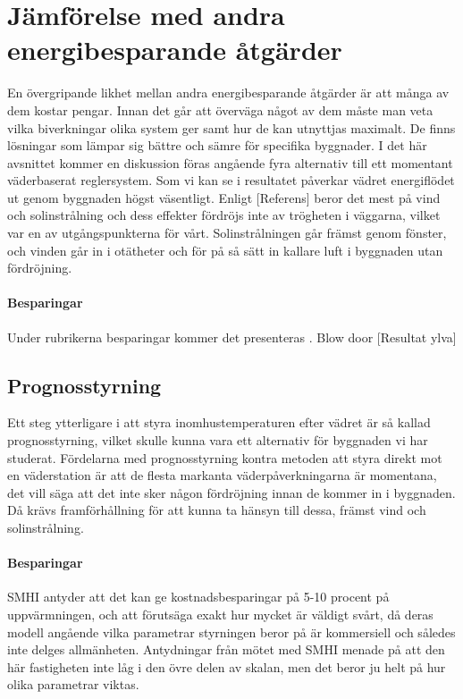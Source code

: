 \section{Jämförelse med andra energibesparande åtgärder}

En övergripande likhet mellan andra energibesparande åtgärder är att många av dem kostar pengar. Innan det går att överväga något av dem måste man veta vilka biverkningar olika system ger samt hur de kan utnyttjas maximalt. De finns lösningar som lämpar sig bättre och sämre för specifika byggnader. I det här avsnittet kommer en diskussion föras angående fyra alternativ till ett momentant väderbaserat reglersystem.
Som vi kan se i resultatet påverkar vädret energiflödet ut genom byggnaden högst väsentligt. Enligt [Referens] beror det mest på vind och solinstrålning och dess effekter fördröjs inte av trögheten i väggarna, vilket var en av utgångspunkterna för vårt. Solinstrålningen går främst genom fönster, och vinden går in i otätheter och för på så sätt in kallare luft i byggnaden utan fördröjning.

\paragraph{Besparingar}
Under rubrikerna besparingar kommer det presenteras . Blow door [Resultat ylva]

\subsection{Prognosstyrning}
Ett steg ytterligare i att styra inomhustemperaturen efter vädret är så kallad prognosstyrning, vilket skulle kunna vara ett alternativ för byggnaden vi har studerat.
Fördelarna med prognosstyrning kontra metoden att styra direkt mot en väderstation är att de flesta markanta väderpåverkningarna är momentana, det vill säga att det inte sker någon fördröjning innan de kommer in i byggnaden. Då krävs framförhållning för att kunna ta hänsyn till dessa, främst vind och solinstrålning.

\paragraph{Besparingar}
SMHI antyder att det kan ge kostnadsbesparingar på 5-10 procent på uppvärmningen, och att förutsäga exakt hur mycket är väldigt svårt, då deras modell angående vilka parametrar styrningen beror på är kommersiell och således inte delges allmänheten.  Antydningar från mötet med SMHI menade på att den här fastigheten inte låg i den övre delen av skalan, men det beror ju helt på hur olika parametrar viktas.

